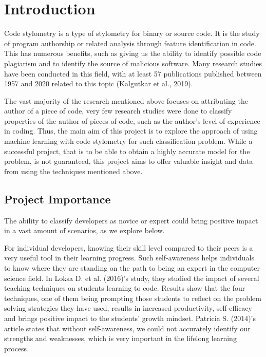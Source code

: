 \documentclass{report}
\begin{document}
\newpage


\setlength{\parskip}{0.5em}
\tableofcontents
\setlength{\parskip}{1.2em}

\chapter{Introduction}

Code stylometry is a type of stylometry for binary or source code. It is the study of program authorship or related analysis through feature identification in code. This has numerous benefits, such as giving us the ability to identify possible code plagiarism and to identify the source of malicious software. Many research studies have been conducted in this field, with at least 57 publications published between 1957 and 2020 related to this topic (Kalgutkar et al., 2019).

The vast majority of the research mentioned above focuses on attributing the author of a piece of code, very few research studies were done to classify properties of the author of pieces of code, such as the author’s level of experience in coding. Thus, the main aim of this project is to explore the approach of using machine learning with code stylometry for such classification problem. While a successful project, that is to be able to obtain a highly accurate model for the problem, is not guaranteed, this project aims to offer valuable insight and data from using the techniques mentioned above.

\section{Project Importance}

The ability to classify developers as novice or expert could bring positive impact in a vast amount of scenarios, as we explore below.

For individual developers, knowing their skill level compared to their peers is a very useful tool in their learning progress. Such self-awareness helps individuals to know where they are standing on the path to being an expert in the computer science field. In Loksa D. et al. (2016)’s study, they studied the impact of several teaching techniques on students learning to code. Results show that the four techniques, one of them being prompting those students to reflect on the problem solving strategies they have used, results in increased productivity, self-efficacy and brings positive impact to the students’ growth mindset. Patricia S. (2014)’s article states that without self-awareness, we could not accurately identify our strengths and weaknesses, which is very important in the lifelong learning process.
\end{document}
